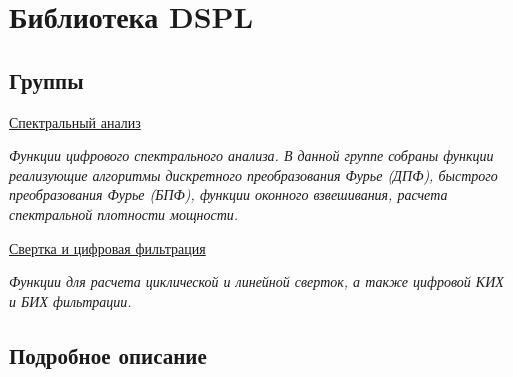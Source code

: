 \hypertarget{group___m_a_i_n___g_r_o_u_p}{}\section{Библиотека D\+S\+P\+L}
\label{group___m_a_i_n___g_r_o_u_p}
\subsection*{Группы}
\begin{DoxyCompactItemize}
\item 
\hyperlink{group___s_p_e_c_t_r_a_l___g_r_o_u_p}{Спектральный анализ}
\begin{DoxyCompactList}\small\item\em Функции цифрового спектрального анализа. В данной группе собраны функции реализующие алгоритмы дискретного преобразования Фурье (ДПФ), быстрого преобразования Фурье (БПФ), функции оконного взвешивания, расчета спектральной плотности мощности. \end{DoxyCompactList}\item 
\hyperlink{group___c_o_n_v___g_r_o_u_p}{Свертка и цифровая фильтрация}
\begin{DoxyCompactList}\small\item\em Функции для расчета циклической и линейной сверток, а также цифровой КИХ и БИХ фильтрации. \end{DoxyCompactList}\end{DoxyCompactItemize}


\subsection{Подробное описание}
